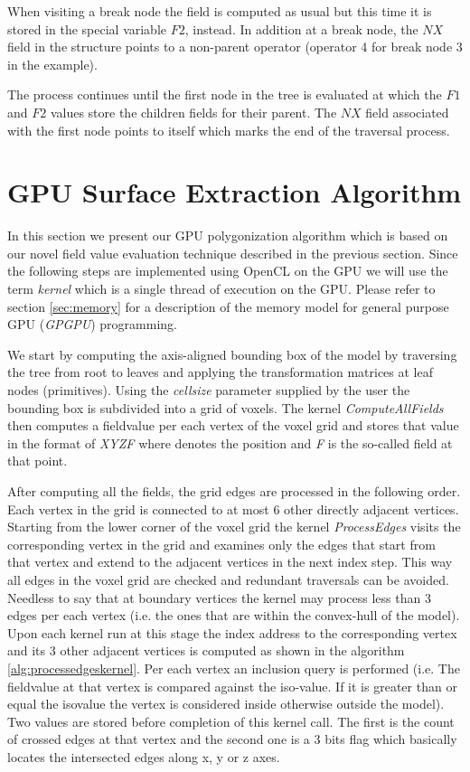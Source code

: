 When visiting a break node the field is computed as usual but this time it is stored in the special variable $F2$, instead. 
In addition at a break node, the $NX$ field in the structure points to a non-parent operator (operator 4 for break node 3 in the example).

The process continues until the first node in the tree is evaluated at which the $F1$ and $F2$ values store the children fields for 
their parent. The $NX$ field associated with the first node points to itself which marks the end of the traversal process.


\section{GPU Surface Extraction Algorithm}
\label{sec:surfextraction}
In this section we present our GPU polygonization algorithm which is based on our novel field value evaluation technique described
in the previous section. Since the following steps are implemented using OpenCL on the GPU we will use the term \textit{kernel} which 
is a single thread of execution on the GPU. Please refer to section \ref{sec:memory} for a description of the memory model for
general purpose GPU (\textit{GPGPU}) programming.

We start by computing the axis-aligned bounding box of the model by traversing the tree from root to leaves 
and applying the transformation matrices at leaf nodes (primitives). Using the \textit{cellsize} parameter supplied by the user the 
bounding box is subdivided into a grid of voxels. The kernel \textit{ComputeAllFields} then computes a fieldvalue per each
vertex of the voxel grid and stores that value in the format of \textit{XYZF} where  denotes the position and 
\textit{F} is the so-called field at that point. 


After computing all the fields, the grid edges are processed in the following order. 
Each vertex in the grid is connected to at most 6 other directly adjacent vertices. Starting from the lower corner of the voxel grid 
the kernel \textit{ProcessEdges} visits the corresponding vertex in the grid and examines only the edges that start 
from that vertex and extend to the adjacent vertices in the next index step. This way all edges in the voxel grid are checked 
and redundant traversals can be avoided. Needless to say that at boundary vertices the kernel may process less than 3 edges per each 
vertex (i.e. the ones that are within the convex-hull of the model). Upon each kernel run at this stage the index address to 
the corresponding vertex and its 3 other adjacent vertices is computed as shown in the algorithm \ref{alg:processedgeskernel}. Per each vertex
an inclusion query is performed (i.e. The fieldvalue at that vertex is compared against the iso-value. If it is greater than or equal 
the isovalue the vertex is considered inside otherwise outside the model). Two values are stored before completion of this kernel call. 
The first is the count of crossed edges at that vertex and the second one is a 3 bits flag which basically locates the intersected 
edges along x, y or z axes.



